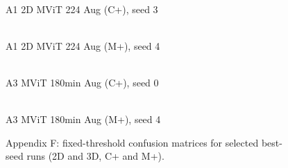 \begin{figure}[p]
\centering
\begin{minipage}{0.48\textwidth}
\centering
{}
\\[-1mm]\scriptsize A1 2D MViT 224 Aug (C+), seed 3
\end{minipage}\hfill
\begin{minipage}{0.48\textwidth}
\centering
{}
\\[-1mm]\scriptsize A1 2D MViT 224 Aug (M+), seed 4
\end{minipage}
\vspace{2mm}
\begin{minipage}{0.48\textwidth}
\centering
{}
\\[-1mm]\scriptsize A3 MViT 180min Aug (C+), seed 0
\end{minipage}\hfill
\begin{minipage}{0.48\textwidth}
\centering
{}
\\[-1mm]\scriptsize A3 MViT 180min Aug (M+), seed 4
\end{minipage}
\caption{Appendix F: fixed-threshold confusion matrices for selected best-seed runs (2D and 3D, C+ and M+).}
\label{fig:appF_cm_grid}
\end{figure}
